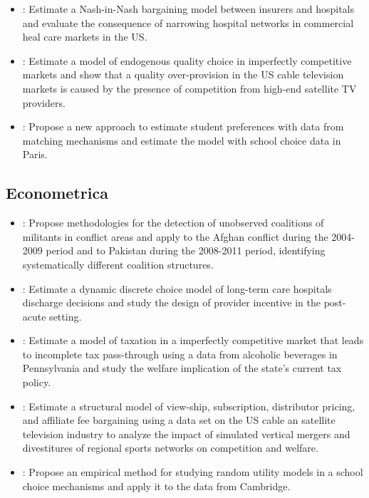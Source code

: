 \documentclass[
]{book}
\begin{document}
\begin{itemize}
\item
  \citet{hoEquilibriumProviderNetworks2019}: Estimate a Nash-in-Nash bargaining model between insurers and hospitals and evaluate the consequence of narrowing hospital networks in commercial heal care markets in the US.
\item
  \citet{crawfordQualityOverprovisionCable2019}: Estimate a model of endogenous quality choice in imperfectly competitive markets and show that a quality over-provision in the US cable television markets is caused by the presence of competition from high-end satellite TV providers.
\item
  \citet{fackTruthTellingPreferenceEstimation2019}: Propose a new approach to estimate student preferences with data from matching mechanisms and estimate the model with school choice data in Paris.
\end{itemize}

\hypertarget{econometrica}{%
\subsection{Econometrica}\label{econometrica}}

\begin{itemize}
\item
  \citet{trebbiInsurgencySmallWars2019}: Propose methodologies for the detection of unobserved coalitions of militants in conflict areas and apply to the Afghan conflict during the 2004-2009 period and to Pakistan during the 2008-2011 period, identifying systematically different coalition structures.
\item
  \citet{einavProviderIncentivesHealthcare2018}: Estimate a dynamic discrete choice model of long-term care hospitals discharge decisions and study the design of provider incentive in the post-acute setting.
\item
  \citet{miraveteMarketPowerLaffer2018}: Estimate a model of taxation in a imperfectly competitive market that leads to incomplete tax pass-through using a data from alcoholic beverages in Pennsylvania and study the welfare implication of the state's current tax policy.
\item
  \citet{crawfordWelfareEffectsVertical2018}: Estimate a structural model of view-ship, subscription, distributor pricing, and affiliate fee bargaining using a data set on the US cable an satellite television industry to analyze the impact of simulated vertical mergers and divestitures of regional sports networks on competition and welfare.
\item
  \citet{agarwalDemandAnalysisUsing2018}: Propose an empirical method for studying random utility models in a school choice mechanisms and apply it to the data from Cambridge.
\end{itemize}
\end{document}
